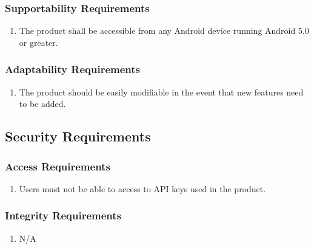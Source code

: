 \documentclass[12pt]{article}
\begin{document}
    \subsubsection{Supportability Requirements}
    \label{ssub:supportability_requirements}
    \begin{enumerate}[{MS-S}1. ]
        \item The product shall be accessible from any Android device running Android 5.0 or greater.
    \end{enumerate}
    
    \subsubsection{Adaptability Requirements}
    \label{ssub:adaptability_requirements}
    \begin{enumerate}[{MS-A}1. ]
        \item The product should be easily modifiable in the event that new features need to be added. 
    
    \end{enumerate}
    
    
    \subsection{Security Requirements}
    \label{sub:security_requirements}
    
    \subsubsection{Access Requirements}
    \label{ssub:access_requirements}
    \begin{enumerate}[{SR-A}1. ]
        \item Users must not be able to access to API keys used in the product.
    \end{enumerate}
    
    \subsubsection{Integrity Requirements}
    \label{ssub:integrity_requirements}
    \begin{enumerate}[{SR-I}1. ]
        \item N/A
    \end{enumerate}
    
\end{document}
